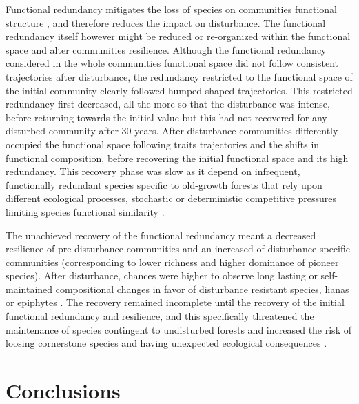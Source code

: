 \documentclass[fleqn,10pt]{ArtEcoFoG} %
\theoremstyle{definition}
\theoremstyle{definition}
\theoremstyle{definition}
\theoremstyle{remark}
\begin{document}
Functional redundancy mitigates the loss of species on communities
functional structure \citep{Carmona2016}, and therefore reduces the
impact on disturbance. The functional redundancy itself however might be
reduced or re-organized within the functional space and alter
communities resilience. Although the functional redundancy considered in
the whole communities functional space did not follow consistent
trajectories after disturbance, the redundancy restricted to the
functional space of the initial community clearly followed humped shaped
trajectories. This restricted redundancy first decreased, all the more
so that the disturbance was intense, before returning towards the
initial value but this had not recovered for any disturbed community
after 30 years. After disturbance communities differently occupied the
functional space following traits trajectories and the shifts in
functional composition, before recovering the initial functional space
and its high redundancy. This recovery phase was slow as it depend on
infrequent, functionally redundant species specific to old-growth
forests that rely upon different ecological processes, stochastic or
deterministic competitive pressures limiting species functional
similarity \citep{Chave2004, Mayfield2010}.

The unachieved recovery of the functional redundancy meant a decreased
resilience of pre-disturbance communities and an increased of
disturbance-specific communities (corresponding to lower richness and
higher dominance of pioneer species). After disturbance, chances were
higher to observe long lasting or self-maintained compositional changes
in favor of disturbance resistant species, lianas or epiphytes
\citep{Haddad2008, Burslem2000, Martin2013}. The recovery remained
incomplete until the recovery of the initial functional redundancy and
resilience, and this specifically threatened the maintenance of species
contingent to undisturbed forests and increased the risk of loosing
cornerstone species and having unexpected ecological consequences
\citep{Jones1994, Chazdon2003a, Diaz2005, Gardner2007}.

\section{Conclusions}\label{conclusions}
\end{document}
